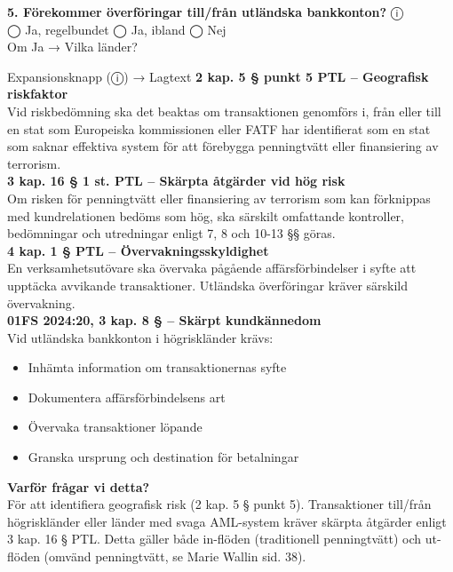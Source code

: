 \documentclass[10pt]{beamer}
\begin{document}
\begin{frame}[label=riskfragor-steg3]
  \vspace{0.3cm}

  \textbf{5. Förekommer överföringar till/från utländska bankkonton?} \hspace{0.3cm} ⓘ\\
  ◯ Ja, regelbundet \hspace{0.3cm} ◯ Ja, ibland \hspace{0.3cm} ◯ Nej\\
  Om Ja → Vilka länder? \underline{\hspace{5cm}}
  \begin{alertblock}{Expansionsknapp (ⓘ) → Lagtext}
    \tiny \textbf{2 kap. 5 § punkt 5 PTL – Geografisk riskfaktor}\\
    \tiny Vid riskbedömning ska det beaktas om transaktionen genomförs i, från eller till en stat som Europeiska kommissionen eller FATF har identifierat som en stat som saknar effektiva system för att förebygga penningtvätt eller finansiering av terrorism.\\[0.1cm]
    \tiny \textbf{3 kap. 16 § 1 st. PTL – Skärpta åtgärder vid hög risk}\\
    \tiny Om risken för penningtvätt eller finansiering av terrorism som kan förknippas med kundrelationen bedöms som hög, ska särskilt omfattande kontroller, bedömningar och utredningar enligt 7, 8 och 10-13 §§ göras.\\[0.1cm]
    \tiny \textbf{4 kap. 1 § PTL – Övervakningsskyldighet}\\
    \tiny En verksamhetsutövare ska övervaka pågående affärsförbindelser i syfte att upptäcka avvikande transaktioner. Utländska överföringar kräver särskild övervakning.\\[0.1cm]
    \tiny \textbf{01FS 2024:20, 3 kap. 8 § – Skärpt kundkännedom}\\
    \tiny Vid utländska bankkonton i högriskländer krävs:\\
    \begin{itemize}
      \item Inhämta information om transaktionernas syfte
      \item Dokumentera affärsförbindelsens art
      \item Övervaka transaktioner löpande
      \item Granska ursprung och destination för betalningar
    \end{itemize}
    \vspace{0.1cm}
    \tiny \textbf{Varför frågar vi detta?}\\
    \tiny För att identifiera geografisk risk (2 kap. 5 § punkt 5). Transaktioner till/från högriskländer eller länder med svaga AML-system kräver skärpta åtgärder enligt 3 kap. 16 § PTL. Detta gäller både in-flöden (traditionell penningtvätt) och ut-flöden (omvänd penningtvätt, se Marie Wallin sid. 38).
  \end{alertblock}


\end{frame}
\end{document}
